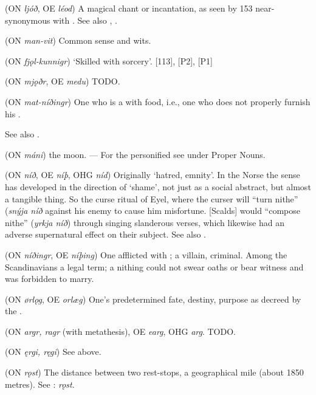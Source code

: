 \begin{itemize}
 (ON \emph{ljóð}, OE \emph{léod})
  A magical chant or incantation, as seen by  153 near-synonymous with .  See also , .

 (ON \emph{man-vit})
  Common sense and wits.

 (ON \emph{fjǫl-kunnigr})
  ‘Skilled with sorcery’.  [113], [P2], [P1]

 (ON \emph{mjǫðr}, OE \emph{medu})
  TODO.

 (ON \emph{mat-níðingr})
  One who is a  with food, i.e., one who does not properly furnish his .

  See also .

 (ON \emph{máni})
  the moon. --- For the personified  see under Proper Nouns.

 (ON \emph{níð}, OE \emph{níþ}, OHG \emph{níd})
  Originally ‘hatred, emnity’.  In the Norse the sense has developed in the direction of ‘shame’, not just as a social abstract, but almost a tangible thing.  So the curse ritual of Eyel, where the curser will “turn nithe” (\emph{snýja níð} against his enemy to cause him misfortune.  [Scalds] would “compose nithe” (\emph{yrkja níð}) through singing slanderous verses, which likewise had an adverse supernatural effect on their subject.  See also .

 (ON \emph{níðingr}, OE \emph{níþing})
  One afflicted with ; a villain, criminal.  Among the Scandinavians a legal term; a nithing could not swear oaths or bear witness and was forbidden to marry.

 (ON \emph{ørlǫg}, OE \emph{orlæg})
  One’s predetermined fate, destiny, purpose as decreed by the .

 (ON \emph{argr, ragr} (with metathesis), OE \emph{earg}, OHG \emph{arg}.
  TODO.

 (ON \emph{ęrgi, ręgi})
  See  above.

 (ON \emph{rǫst})
  The distance between two rest-stops, a geographical mile (about 1850 metres).  See \CV: \emph{rǫst}.


\end{itemize}
